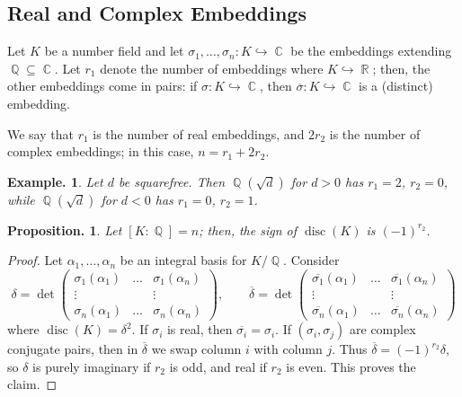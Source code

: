 \documentclass[11pt, a4paper]{memoir}
\DeclareMathOperator{\Q}{{\mathbb{Q}}}
\DeclareMathOperator{\R}{{\mathbb{R}}}
\DeclareMathOperator{\C}{{\mathbb{C}}}
\newcommand{\hto}[0]{\ensuremath{\hookrightarrow}}
\newcommand{\ol}[1]{\ensuremath{\overline{#1}}}
\theoremstyle{change}
\newtheorem{proposition}[theorem]{Proposition.}
\theoremstyle{plain}
\theoremstyle{nonumberplain}
\newtheorem{example}{Example.}
\newtheorem{proof}{Proof}
\DeclareMathOperator{\disc}{disc}
\begin{document}
\subsection{Real and Complex Embeddings}
Let $K$ be a number field and let $\sigma_1,\ldots,\sigma_n:K\hto\C$ be the embeddings extending $\Q\subseteq\C$.
Let $r_1$ denote the number of embeddings where $K\hto\R$; then, the other embeddings come in pairs: if $\sigma:K\hto\C$, then $\ol{\sigma}:K\hto\C$ is a (distinct) embedding.

We say that $r_1$ is the number of real embeddings, and $2r_2$ is the number of complex embeddings; in this case, $n=r_1+2r_2$.
\begin{example}
    Let $d$ be squarefree.
    Then $\Q(\sqrt{d})$ for $d>0$ has $r_1=2$, $r_2=0$, while $\Q(\sqrt{d})$ for $d<0$ has $r_1=0$, $r_2=1$.
\end{example}
\begin{proposition}
    Let $[K:\Q]=n$; then, the sign of $\disc(K)$ is $(-1)^{r_2}$.
\end{proposition}
\begin{proof}
    Let $\alpha_1,\ldots,\alpha_n$ be an integral basis for $K/\Q$.
    Consider
    \begin{equation*}
        \delta=\det
        \begin{pmatrix}
            \sigma_1(\alpha_1)&\hdots&\sigma_1(\alpha_n)\\
            \vdots&&\vdots\\
            \sigma_n(\alpha_1)&\hdots&\sigma_n(\alpha_n)
        \end{pmatrix}
        ,\qquad
        \ol{\delta}=\det
        \begin{pmatrix}
            \ol{\sigma_1}(\alpha_1)&\hdots&\ol{\sigma_1}(\alpha_n)\\
            \vdots&&\vdots\\
            \ol{\sigma_n}(\alpha_1)&\hdots&\ol{\sigma_n}(\alpha_n)
        \end{pmatrix}
    \end{equation*}
    where $\disc(K)=\delta^2$.
    If $\sigma_i$ is real, then $\ol{\sigma_i}=\sigma_i$.
    If $(\sigma_i,\sigma_j)$ are complex conjugate pairs, then in $\ol{\delta}$ we swap column $i$ with column $j$.
    Thus $\ol{\delta}=(-1)^{r_2}\delta$, so $\delta$ is purely imaginary if $r_2$ is odd, and real if $r_2$ is even.
    This proves the claim.
\end{proof}
\end{document}
